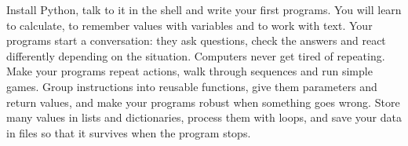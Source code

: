 
  {Install Python, talk to it in the shell and write your first programs. You will learn to
   calculate, to remember values with variables and to work with text.}
  {Your programs start a conversation: they ask questions, check the answers and react
   differently depending on the situation.}
  {Computers never get tired of repeating. Make your programs repeat actions, walk through
   sequences and run simple games.}
  {Group instructions into reusable functions, give them parameters and return values, and make
   your programs robust when something goes wrong.}
  {Store many values in lists and dictionaries, process them with loops, and save your data in
   files so that it survives when the program stops.}

